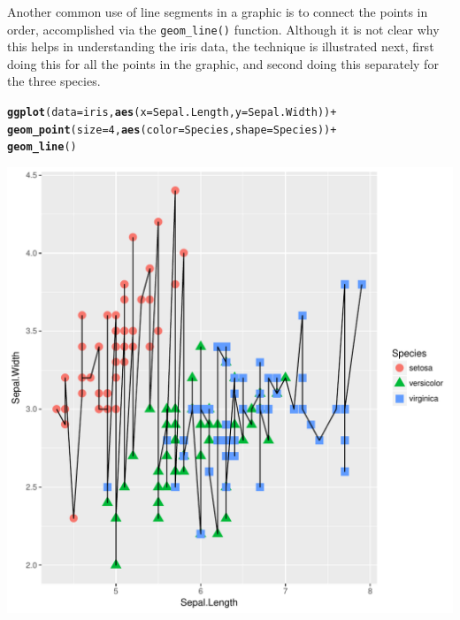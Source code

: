 \documentclass[12pt,oneside]{book}\usepackage[]{graphicx}\usepackage[]{color}
\makeatletter
\def\maxwidth{ %
  \ifdim\Gin@nat@width>\linewidth
    \linewidth
  \else
    \Gin@nat@width
  \fi
}
\newcommand{\hlnum}[1]{\textcolor[rgb]{0.686,0.059,0.569}{#1}}%
\newcommand{\hlopt}[1]{\textcolor[rgb]{0,0,0}{#1}}%
\newcommand{\hlstd}[1]{\textcolor[rgb]{0.345,0.345,0.345}{#1}}%
\newcommand{\hlkwc}[1]{\textcolor[rgb]{0.333,0.667,0.333}{#1}}%
\newcommand{\hlkwd}[1]{\textcolor[rgb]{0.737,0.353,0.396}{\textbf{#1}}}%
\newenvironment{kframe}{%
 \def\at@end@of@kframe{}%
 \ifinner\ifhmode%
  \def\at@end@of@kframe{\end{minipage}}%
  \begin{minipage}{\columnwidth}%
 \fi\fi%
 \def\FrameCommand##1{\hskip\@totalleftmargin \hskip-\fboxsep
 \colorbox{shadecolor}{##1}\hskip-\fboxsep
     \hskip-\linewidth \hskip-\@totalleftmargin \hskip\columnwidth}%
 \MakeFramed {\advance\hsize-\width
   \@totalleftmargin\z@ \linewidth\hsize
   \@setminipage}}%
 {\par\unskip\endMakeFramed%
 \at@end@of@kframe}
\newenvironment{knitrout}{}{} %
\makeatother
\begin{document}
Another common use of line segments in a graphic is to connect the points in order, accomplished via the \verb+geom_line()+ function. Although it is not clear why this helps in understanding the iris data, the technique is illustrated next, first doing this for all the points in the graphic, and second doing this separately for the three species. 
\begin{knitrout}
\color{fgcolor}\begin{kframe}
\begin{alltt}
\hlkwd{ggplot}\hlstd{(}\hlkwc{data} \hlstd{= iris,} \hlkwd{aes}\hlstd{(}\hlkwc{x} \hlstd{= Sepal.Length,} \hlkwc{y} \hlstd{= Sepal.Width))} \hlopt{+}
    \hlkwd{geom_point}\hlstd{(}\hlkwc{size} \hlstd{=} \hlnum{4}\hlstd{,} \hlkwd{aes}\hlstd{(}\hlkwc{color}\hlstd{=Species,} \hlkwc{shape} \hlstd{= Species))} \hlopt{+}
    \hlkwd{geom_line}\hlstd{()}
\end{alltt}
\end{kframe}
\includegraphics[width=\maxwidth]{figure/unnamed-chunk-68-1} 

\end{knitrout}
\end{document}
